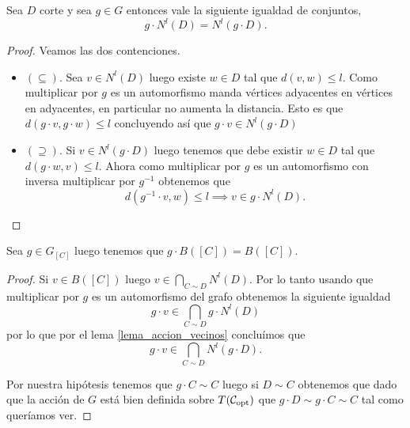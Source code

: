 \documentclass[tesis.tex]{subfiles}
\begin{document}
\begin{lema}\label{lema_accion_vecinos}
	Sea $D$ corte y sea $g \in G$ entonces vale la siguiente igualdad de conjuntos,
	\[
		g \cdot N^l(D) = N^l(g \cdot D).
	\]
\end{lema}

\begin{proof}
	Veamos las dos contenciones.
	
	\begin{itemize}
		\item $(\subseteq)$. 
		Sea $v \in N^l(D)$ luego existe $w \in D$ tal que $d(v,w) \le l$.
		Como multiplicar por $g$ es un automorfismo manda vértices adyacentes en vértices en adyacentes, en particular no aumenta la distancia.
		Esto es que $d(g\cdot v,g\cdot w) \le l$ concluyendo así que $g \cdot v \in N^l(g \cdot D)$  
		\item $(\supseteq)$.
		Si $v \in N^l(g\cdot D)$ luego tenemos que debe existir $w \in D$ tal que $d(g \cdot w, v) \le l$.
		Ahora como multiplicar por $g$ es un automorfismo con inversa multiplicar por $g^{-1}$ obtenemos que 
		\[
			d(g^{-1} \cdot v, w) \le l \implies v \in g\cdot N^l(D).
		\]
	\end{itemize}
\end{proof}

\begin{lema}\label{lema_g_actua_b(C)}
	Sea $g \in G_{[C]}$ luego tenemos que $g \cdot B([C]) = B([C])$.
\end{lema}
\begin{proof}
	Si $v \in B([C])$ luego $v \in \bigcap_{C \sim D} N^l(D)$.
	Por lo tanto usando que multiplicar por $g$ es un automorfismo del grafo obtenemos la siguiente igualdad
	\[
		g\cdot v \in \bigcap_{C \sim D} g \cdot N^l(D)
	\]
	por lo que por el lema \ref{lema_accion_vecinos} concluímos que 
	\[
		g\cdot v \in \bigcap_{C \sim D}   N^l(g\cdot D).
	\]	
	
	Por nuestra hipótesis tenemos que $g \cdot C \sim C$ luego si $D \sim C$ obtenemos que dado que la acción de $G$ está bien definida sobre $T({\cal C}_{\text{opt}})$ que $g\cdot D \sim g\cdot C \sim C$ tal como queríamos ver.		
\end{proof}
\end{document}
